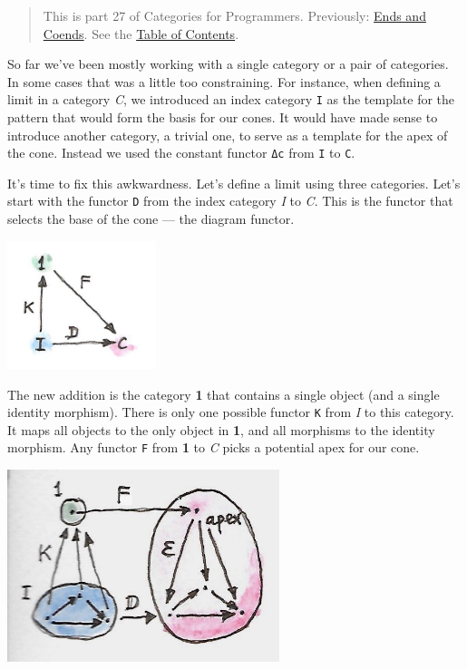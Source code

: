 \begin{quote}
This is part 27 of Categories for Programmers. Previously:
\href{https://bartoszmilewski.com/2017/03/29/ends-and-coends/}{Ends and
Coends}. See the
\href{https://bartoszmilewski.com/2014/10/28/category-theory-for-programmers-the-preface/}{Table
of Contents}.
\end{quote}

So far we've been mostly working with a single category or a pair of
categories. In some cases that was a little too constraining. For
instance, when defining a limit in a category \emph{C}, we introduced an
index category \texttt{I} as the template for the pattern that would
form the basis for our cones. It would have made sense to introduce
another category, a trivial one, to serve as a template for the apex of
the cone. Instead we used the constant functor \texttt{Δc} from
\texttt{I} to \texttt{C}.

It's time to fix this awkwardness. Let's define a limit using three
categories. Let's start with the functor \texttt{D} from the index
category \emph{I} to \emph{C}. This is the functor that selects the base
of the cone --- the diagram functor.

\includegraphics[width=1.70833in]{images/kan2.jpg}

The new addition is the category \textbf{1} that contains a single
object (and a single identity morphism). There is only one possible
functor \texttt{K} from \emph{I} to this category. It maps all objects
to the only object in \textbf{1}, and all morphisms to the identity
morphism. Any functor \texttt{F} from \textbf{1} to \emph{C} picks a
potential apex for our cone.

\includegraphics[width=3.12500in]{images/kan15.jpg}

